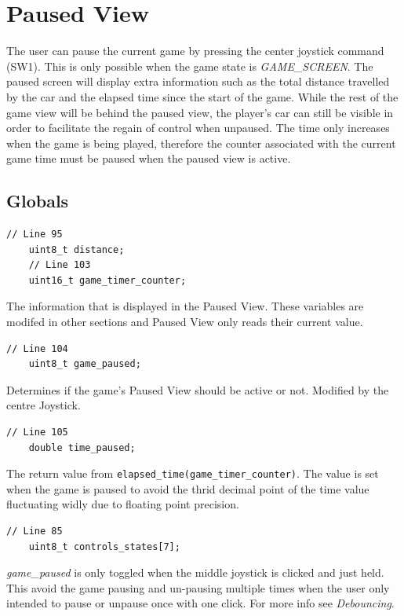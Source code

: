 \documentclass{article}
\begin{document}
\clearpage

\section{Paused View}
The user can pause the current game by pressing the center joystick command (SW1). This is only possible when the game state is \emph{GAME\_SCREEN}. The paused screen will display extra information such as the total distance travelled by the car and the elapsed time since the start of the game. While the rest of the game view will be behind the paused view, the player's car can still be visible in order to facilitate the regain of control when unpaused. The time only increases when the game is being played, therefore the counter associated with the current game time must be paused when the paused view is active.

\subsection*{Globals}
\begin{lstlisting}[style=CStyle]
	// Line 95
	uint8_t distance;
	// Line 103
	uint16_t game_timer_counter;
\end{lstlisting}
The information that is displayed in the Paused View. These variables are modifed in other sections and Paused View only reads their current value.
\begin{lstlisting}[style=CStyle]
	// Line 104
	uint8_t game_paused;
\end{lstlisting}
Determines if the game's Paused View should be active or not. Modified by the centre Joystick.
\begin{lstlisting}[style=CStyle]
	// Line 105
	double time_paused;
\end{lstlisting}
The return value from \lstinline{elapsed_time(game_timer_counter)}. The value is set when the game is paused to avoid the thrid decimal point of the time value fluctuating widly due to floating point precision.
\begin{lstlisting}[style=CStyle]
	// Line 85
	uint8_t controls_states[7];
\end{lstlisting}
\emph{game\_paused} is only toggled when the middle joystick is clicked and just held. This avoid the game pausing and un-pausing multiple times when the user only intended to pause or unpause once with one click. For more info see \emph{Debouncing}.
\newline
\end{document}
